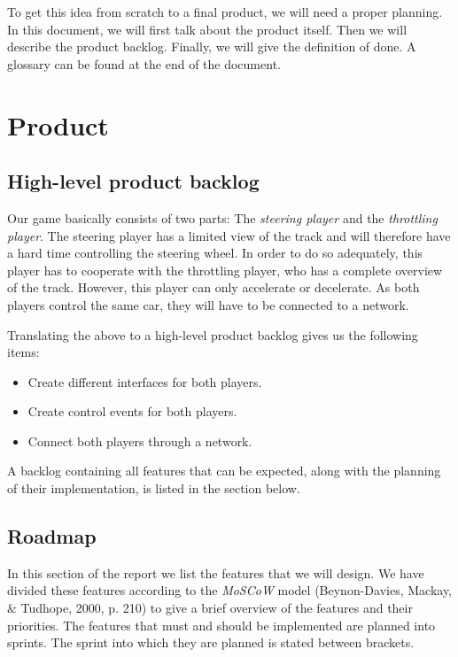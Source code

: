 \documentclass[11pt,twoside,a4paper]{article}
\begin{document}
To get this idea from scratch to a final product, we will need a proper planning. In this document, we will first talk about the product itself. Then we will describe the product backlog. Finally, we will give the definition of done. A glossary can be found at the end of the document.


\section{Product}

\subsection{High-level product backlog}
Our game basically consists of two parts: The \emph{steering player} and the \emph{throttling player}. The steering player has a limited view of the track and will therefore have a hard time controlling the steering wheel. In order to do so adequately, this player has to cooperate with the throttling player, who has a complete overview of the track. However, this player can only accelerate or decelerate. As both players control the same car, they will have to be connected to a network.

Translating the above to a high-level product backlog gives us the following items:

\begin{itemize}
	\item Create different interfaces for both players.
	\item Create control events for both players.
	\item Connect both players through a network.
\end{itemize}

A backlog containing all features that can be expected, along with the planning of their implementation, is listed in the section below.


\newpage

\subsection{Roadmap}
In this section of the report we list the features that we will design. We have divided these features according to the \emph{MoSCoW} model (Beynon-Davies, Mackay, \& Tudhope, 2000, p. 210) to give a brief overview of the features and their priorities. The features that must and should be implemented are planned into sprints. The sprint into which they are planned is stated between brackets.
\end{document}
